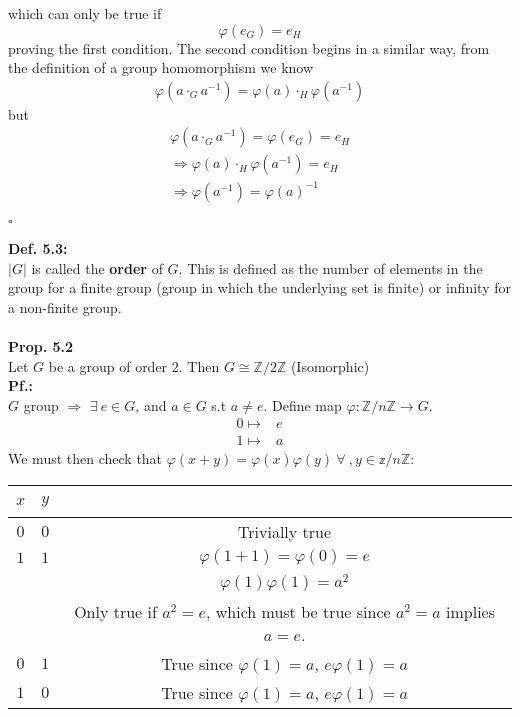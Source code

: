 \documentclass{article}
\begin{document}
which can only be true if
\begin{equation}
\varphi(e_G)=e_H
\end{equation}
proving the first condition. The second condition begins in a similar way, from the definition of a group homomorphism we know
\begin{align*}
\varphi(a\cdot_G a^{-1})=\varphi(a)\cdot_H\varphi(a^{-1})
\end{align*}
but 
\begin{align*}
\varphi(a\cdot_Ga^{-1})=\varphi(e_G)=e_H\\
\Rightarrow \varphi(a)\cdot_H\varphi(a^{-1})=e_H\\
\Rightarrow \varphi(a^{-1})=\varphi(a)^{-1}
\end{align*}
\begin{flushright}
$\square$
\end{flushright}
\textbf{Def. 5.3:}\\
$|G|$ is called the \textbf{order} of $G$. This is defined as the number of elements in the group for a finite group (group in which the underlying set is finite) or infinity for a non-finite group.\\
\vspace{2mm}~\\
\textbf{Prop. 5.2}\\
Let $G$ be a group of order $2$. Then $G\cong \mathbb{Z}/2\mathbb{Z}$ (Isomorphic)
\vspace{2mm}~\\
\textbf{Pf.:}\\
$G$ group $\Rightarrow$ $\exists~e\in G$, and $ a\in G$ s.t $a\neq e$. Define map $\varphi:\mathbb{Z}/n\mathbb{Z}\rightarrow G$.
\begin{align*}
0\mapsto&e\\
1\mapsto&a
\end{align*}
We must then check that $\varphi(x+y)=\varphi(x)\varphi(y)~\forall~,y\in \mathbb{z}/n\mathbb{Z}$:\\
\begin{center}
\begin{tabular}{c|c|c}
$x$&$y$&~\\
\hline
$0$&$0$&Trivially true\\
\hline
$1$&$1$&$\varphi(1+1)=\varphi(0)=e$\\
~&~&$\varphi (1)\varphi(1)=a^2$\\
~&~&Only true if $a^2=e$, which must be true since $a^2=a$ implies $a=e$.\\
\hline
$0$&$1$&True since $\varphi(1)=a$, $e\varphi(1)=a$\\
\hline
$1$&$0$&True since $\varphi(1)=a$, $e\varphi(1)=a$\\
\end{tabular}
\end{center}
\end{document}
